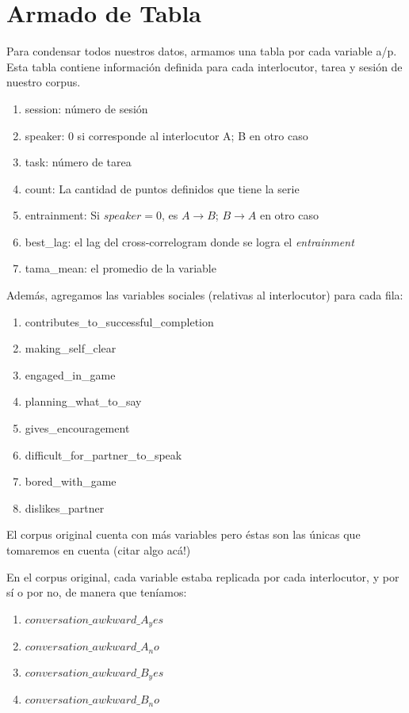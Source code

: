 \section{Armado de Tabla}

Para condensar todos nuestros datos, armamos una tabla por cada variable a/p. Esta tabla contiene información definida para cada interlocutor, tarea y sesión de nuestro corpus.

\begin{enumerate}
  \item session: número de sesión
  \item speaker: 0 si corresponde al interlocutor A; B en otro caso
  \item task: número de tarea
  \item count: La cantidad de puntos definidos que tiene la serie
  \item entrainment: Si $speaker=0$, es $A\rightarrow B$; $B \rightarrow A$ en otro caso
  \item best\_lag: el lag del cross-correlogram donde se logra el \emph{entrainment}
  \item tama\_mean: el promedio de la variable
\end{enumerate}

Además, agregamos las variables sociales (relativas al interlocutor) para cada fila:

\begin{enumerate}
\item contributes\_to\_successful\_completion
\item making\_self\_clear
\item engaged\_in\_game
\item planning\_what\_to\_say
\item gives\_encouragement
\item difficult\_for\_partner\_to\_speak
\item bored\_with\_game
\item dislikes\_partner
\end{enumerate}

El corpus original cuenta con más variables pero éstas son las únicas que tomaremos en cuenta (citar algo acá!)

En el corpus original, cada variable estaba replicada por cada interlocutor, y por sí o por no, de manera que teníamos:

\begin{enumerate}
  \item $conversation\_awkward\_A_yes$
  \item $conversation\_awkward\_A_no$
  \item $conversation\_awkward\_B_yes$
  \item $conversation\_awkward\_B_no$
\end{enumerate}


